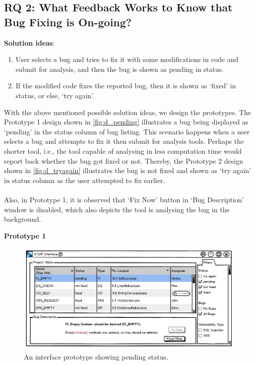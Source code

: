 \subsection{RQ 2: What Feedback Works to Know that Bug Fixing is On-going?}

\textbf{Solution ideas}: \\
\begin{enumerate}
\item  User selects a bug and tries to fix it with some modifications in code and submit for analysis, and then the bug is shown as pending in status.
\item  If the modified code fixes the reported bug, then it is shown as ‘fixed’ in status, or else, ‘try again’.
\end{enumerate}

With the above mentioned possible solution ideas, we design the prototypes. The Prototype 1 design shown in \autoref{fig:d_pending} illustrates a bug being displayed as ‘pending’ in the status column of bug listing. This scenario happens when a user selects a bug and attempts to fix it then submit for analysis tools. Perhaps the shorter tool, i.e., the tool capable of analysing in less computation time would report back whether the bug got fixed or not. Thereby, the Prototype 2 design shown in \autoref{fig:d_tryagain} illustrates the bug is not fixed and shown as ‘try again’ in status column as the user attempted to fix earlier. \\ \\

Also, in Prototype 1, it is observed that ‘Fix Now’ button in ‘Bug Description’ window is disabled, which also depicts the tool is analysing the bug in the background. \\

\clearpage 

\textbf{Prototype 1}

\begin{figure}[hbt!]
	\centering
	\includegraphics[width=\linewidth]{figures/d_pending}
	\caption{An interface prototype showing pending status.}
	\label{fig:d_pending}
\end{figure}

